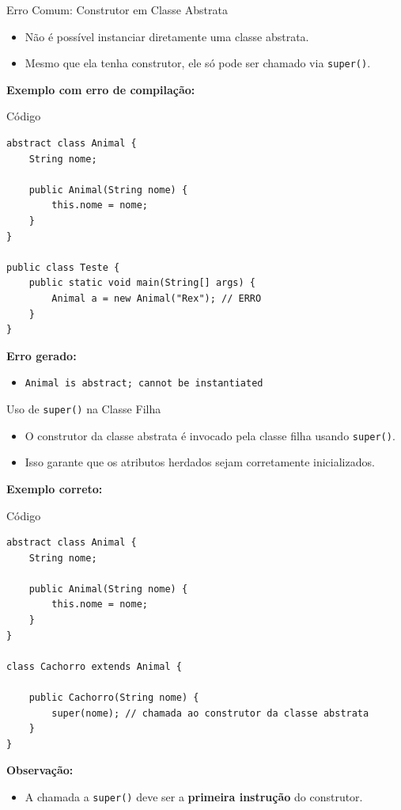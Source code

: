 \documentclass[9pt]{beamer}
\begin{document}
\begin{frame}[fragile]{Erro Comum: Construtor em Classe Abstrata}
\begin{itemize}
    \item Não é possível instanciar diretamente uma classe abstrata.
    \item Mesmo que ela tenha construtor, ele só pode ser chamado via \texttt{super()}.
\end{itemize}


\textbf{Exemplo com erro de compilação:}

\begin{block}{Código}
\begin{verbatim}
abstract class Animal {
    String nome;

    public Animal(String nome) {
        this.nome = nome;
    }
}

public class Teste {
    public static void main(String[] args) {
        Animal a = new Animal("Rex"); // ERRO
    }
}
\end{verbatim}
\end{block}


\textbf{Erro gerado:}
\begin{itemize}
    \item \texttt{Animal is abstract; cannot be instantiated}
\end{itemize}

\end{frame}
\begin{frame}[fragile]{Uso de \texttt{super()} na Classe Filha}
\begin{itemize}
    \item O construtor da classe abstrata é invocado pela classe filha usando \texttt{super()}.
    \item Isso garante que os atributos herdados sejam corretamente inicializados.
\end{itemize}

\vspace{0.3cm}

\textbf{Exemplo correto:}

\begin{block}{Código}
\begin{verbatim}
abstract class Animal {
    String nome;

    public Animal(String nome) {
        this.nome = nome;
    }
}

class Cachorro extends Animal {

    public Cachorro(String nome) {
        super(nome); // chamada ao construtor da classe abstrata
    }
}
\end{verbatim}
\end{block}

\vspace{0.3cm}

\textbf{Observação:}
\begin{itemize}
    \item A chamada a \texttt{super()} deve ser a \textbf{primeira instrução} do construtor.
\end{itemize}

\end{frame}
\end{document}
